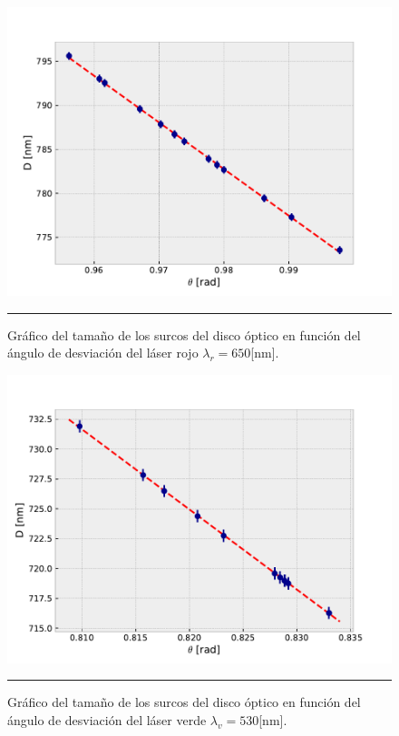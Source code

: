 \documentclass[10pt,a4paper]{article}
\begin{document}
\begin{multicols}{2}
	\begin{figure}[H]
		\centering
		\includegraphics[scale=0.4]{laser_rojo.pdf}
		\caption{Gráfico del tamaño de los surcos del disco óptico en función del ángulo de desviación del láser rojo $\lambda_r = 650$[nm].}
		\label{Grafico laser rojo}
		\rule{80mm}{0.1mm}
	\end{figure}
	
	\begin{figure}[H]
		\centering
		\includegraphics[scale=0.4]{laser_verde.pdf}
		\caption{Gráfico del tamaño de los surcos del disco óptico en función del ángulo de desviación del láser verde $\lambda_v = 530$[nm]. }
		\label{Grafico laser verde}
		\rule{80mm}{0.1mm}
	\end{figure}
	


\end{multicols}
\end{document}
